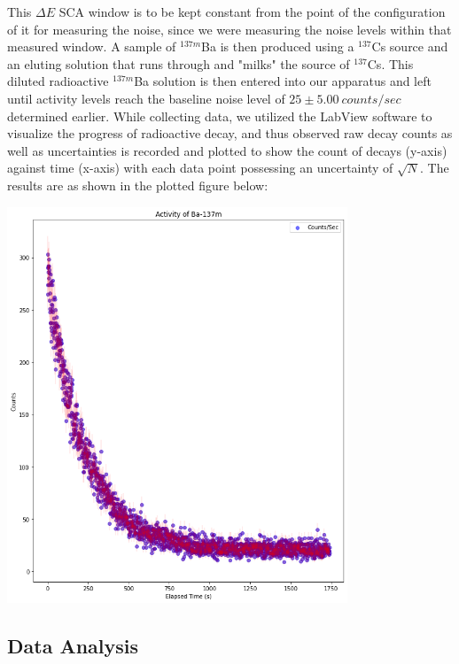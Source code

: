 \documentclass[10pt,letterpaper,onecolumn]{article}
\begin{document}
This $\Delta E$ SCA window is to be kept constant from the point of the configuration of it for measuring the noise, since we were measuring the noise levels within that measured window. A sample of $^{137m}$Ba is then produced using a $^{137}$Cs source and an eluting solution that runs through and "milks" the source of $^{137}$Cs. This diluted radioactive $^{137m}$Ba solution is then entered into our apparatus and left until activity levels reach the baseline noise level of $25 \pm 5.00\ counts/sec$ determined earlier. While collecting data, we utilized the LabView software to visualize the progress of radioactive decay, and thus observed raw decay counts as well as uncertainties is recorded and plotted to show the count of decays (y-axis) against time (x-axis) with each data point possessing an uncertainty of $\sqrt{N}$. The results are as shown in the plotted figure below:


 \begin{center}
 \includegraphics*[width=4in]{Plot with Error Bar.png}
 \label{fig:Data} 
 \end{center}

\subsection{Data Analysis}

\end{document}
